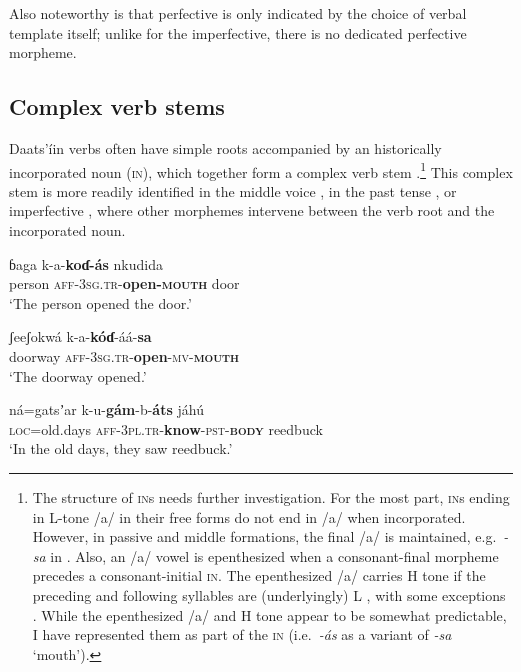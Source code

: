 \documentclass[output=paper]{langsci/langscibook}
\begin{document}
Also noteworthy is that perfective is only indicated by the choice of verbal template itself; unlike for the imperfective, there is no dedicated perfective morpheme.

\subsection{Complex verb stems}\label{sec:ahlandc:4.1}

Daats’íin verbs often have simple roots accompanied by an historically incorporated noun (\textsc{in}), which together form a complex verb stem .\footnote{The structure of \textsc{in}s needs further investigation. For the most part, \textsc{in}s ending in L-tone /a/ in their free forms do not end in /a/ when incorporated. However, in passive and middle formations, the final /a/ is maintained, e.g.\ \textit{{}-sa} in . Also, an /a/ vowel is epenthesized when a consonant-final morpheme precedes a consonant-initial \textsc{in}. The epenthesized /a/ carries H tone if the preceding and following syllables are (underlyingly) L , with some exceptions . While the epenthesized /a/ and H tone appear to be somewhat predictable, I have represented them as part of the \textsc{in} (i.e.\ \textit{{}-ás} as a variant of \textit{{}-sa} ‘mouth’). } This complex stem is more readily identified in the middle voice , in the past tense , or imperfective , where other morphemes intervene between the verb root and the incorporated noun.

\ea\label{ex:ahlandc:8}
\gll
ɓaga  k-a-\textbf{koɗ-ás}    nkudida  \\ 
person  \textsc{aff}{}-\textsc{3sg.tr}{}-\textbf{open-}\textbf{\textsc{mouth}}    door \\
\glt
‘The person opened the door.’ 
\z

\ea\label{ex:ahlandc:9}
\gll 
ʃeeʃokwá   k-a-\textbf{k\'{o}ɗ}{}-áá-\textbf{sa} \\
doorway   \textsc{aff-3sg.tr}{}-\textbf{open}{}-\textsc{mv-}\textbf{\textsc{mouth}} \\
\glt
‘The doorway opened.’
\z

\ea\label{ex:ahlandc:10}
\gll 
ná=gatsʼar  k-u-\textbf{gám}{}-b-\textbf{áts}                             jáhú \\
\textsc{loc}=old.days  \textsc{aff}\textsc{{}-3pl.tr}{}-\textbf{know}{}-\textsc{pst-}\textbf{\textsc{body}}    reedbuck \\
\glt
‘In the old days, they saw reedbuck.’
\z
\end{document}
